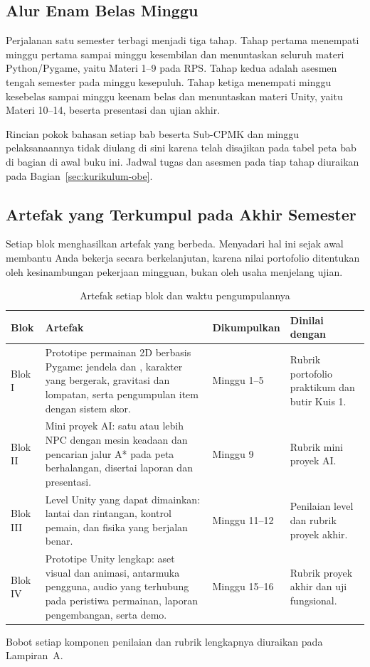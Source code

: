\subsection{Alur Enam Belas Minggu}

Perjalanan satu semester terbagi menjadi tiga tahap. Tahap pertama menempati
minggu pertama sampai minggu kesembilan dan menuntaskan seluruh materi
Python/Pygame, yaitu Materi 1--9 pada RPS. Tahap kedua adalah asesmen tengah
semester pada minggu kesepuluh. Tahap ketiga menempati minggu kesebelas sampai
minggu keenam belas dan menuntaskan materi Unity, yaitu Materi 10--14, beserta
presentasi dan ujian akhir.

Rincian pokok bahasan setiap bab beserta Sub-CPMK dan minggu pelaksanaannya
tidak diulang di sini karena telah disajikan pada tabel peta bab di bagian
 di awal buku ini. Jadwal
tugas dan asesmen pada tiap tahap diuraikan pada
Bagian~\ref{sec:kurikulum-obe}.

\subsection{Artefak yang Terkumpul pada Akhir Semester}

Setiap blok menghasilkan artefak yang berbeda. Menyadari hal ini sejak awal
membantu Anda bekerja secara berkelanjutan, karena nilai portofolio ditentukan
oleh kesinambungan pekerjaan mingguan, bukan oleh usaha menjelang ujian.

\begin{table}[htbp]
\centering
\caption{Artefak setiap blok dan waktu pengumpulannya}
\label{tab:artefak}
{\setlength{\tabcolsep}{4pt}\footnotesize%
\begin{tabularx}{\textwidth}{@{}C{1.5cm} L{4.8cm} C{2.4cm} Y@{}}
\toprule
\headrow \textbf{Blok} & \textbf{Artefak} & \textbf{Dikumpulkan} & \textbf{Dinilai dengan} \\
\midrule
Blok I & Prototipe permainan 2D berbasis Pygame: jendela dan
, karakter yang bergerak, gravitasi dan lompatan, serta
pengumpulan item dengan sistem skor. &
Minggu 1--5 & Rubrik portofolio praktikum dan butir Kuis 1. \\
\addlinespace
Blok II & Mini proyek AI: satu atau lebih NPC dengan mesin keadaan dan
pencarian jalur A* pada peta berhalangan, disertai laporan 
dan presentasi. &
Minggu 9 & Rubrik mini proyek AI. \\
\addlinespace
Blok III & Level Unity yang dapat dimainkan: lantai dan rintangan, kontrol
pemain, dan fisika yang berjalan benar. &
Minggu 11--12 & Penilaian level dan rubrik proyek akhir. \\
\addlinespace
Blok IV & Prototipe Unity lengkap: aset visual dan animasi, antarmuka pengguna,
audio yang terhubung pada peristiwa permainan, laporan pengembangan, serta
demo. &
Minggu 15--16 & Rubrik proyek akhir dan uji fungsional. \\
\bottomrule
\end{tabularx}}
\end{table}

Bobot setiap komponen penilaian dan rubrik lengkapnya diuraikan pada
Lampiran~A.
